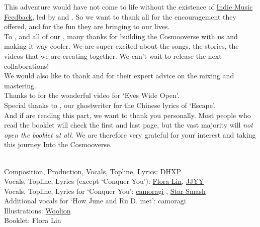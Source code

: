 

This adventure would have not come to life without the existence of \href{https://indiemusicfeedback.com}{Indie Music Feedback}, led by  and . So we want to thank all  for the encouragement they offered, and for the fun they are bringing to our lives.\\

To ,  and all of our , many thanks for building the Cosmooverse with us and making it way cooler. We are super excited about the songs, the stories, the videos that we are creating together. We can't wait to release the next collaborations!\\

We would also like to thank  and  for their expert advice on the mixing and mastering.\\

Thanks to  for the wonderful video for `Eyes Wide Open'.\\

Special thanks to , our ghostwriter for the Chinese lyrics of `Escape'.\\

And if  are reading this part, we want to thank you personally. Most people who read the booklet will check the first and last page, but the vast majority will \emph{not open the booklet at all}. We are therefore very grateful for your interest and taking this journey Into the Cosmooverse.

\clearpage



\phantom{*}\\
Composition, Production, Vocals, Topline, Lyrics: \href{https://linktr.ee/dhxp}{DHXP}\\
Vocals, Topline, Lyrics (except `Conquer You'): \href{https://www.youtube.com/channel/UC7pM7YKe9U1D1Xl4s_xroBw}{Flora Lin}, \href{https://instagram.com/teoritical}{JJYY} \\
Vocals, Topline, Lyrics for `Conquer You': \href{https://www.camoragi.com/}{camoragi} , \href{https://soundcloud.com/starsmashofficial}{Star Smash} \\
Additional vocals for `How June and Ru D. met': camoragi\\
Illustrations: \href{https://twitter.com/wooliondraws}{Woolion}\\
Booklet: Flora Lin

